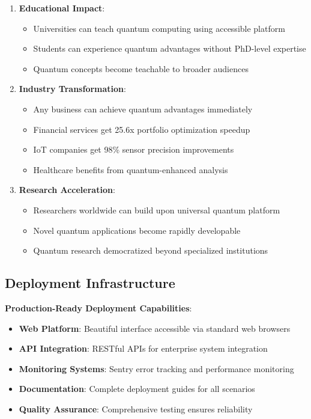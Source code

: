 \documentclass[12pt,a4paper]{article}
\begin{document}
\begin{enumerate}
    \item \textbf{Educational Impact}:
    \begin{itemize}
        \item Universities can teach quantum computing using accessible platform
        \item Students can experience quantum advantages without PhD-level expertise
        \item Quantum concepts become teachable to broader audiences
    \end{itemize}
    
    \item \textbf{Industry Transformation}:
    \begin{itemize}
        \item Any business can achieve quantum advantages immediately
        \item Financial services get 25.6x portfolio optimization speedup
        \item IoT companies get 98\% sensor precision improvements
        \item Healthcare benefits from quantum-enhanced analysis
    \end{itemize}
    
    \item \textbf{Research Acceleration}:
    \begin{itemize}
        \item Researchers worldwide can build upon universal quantum platform
        \item Novel quantum applications become rapidly developable
        \item Quantum research democratized beyond specialized institutions
    \end{itemize}
\end{enumerate}

\subsection{Deployment Infrastructure}

\textbf{Production-Ready Deployment Capabilities}:
\begin{itemize}
    \item \textbf{Web Platform}: Beautiful interface accessible via standard web browsers
    \item \textbf{API Integration}: RESTful APIs for enterprise system integration
    \item \textbf{Monitoring Systems}: Sentry error tracking and performance monitoring
    \item \textbf{Documentation}: Complete deployment guides for all scenarios
    \item \textbf{Quality Assurance}: Comprehensive testing ensures reliability
\end{itemize}
\end{document}

